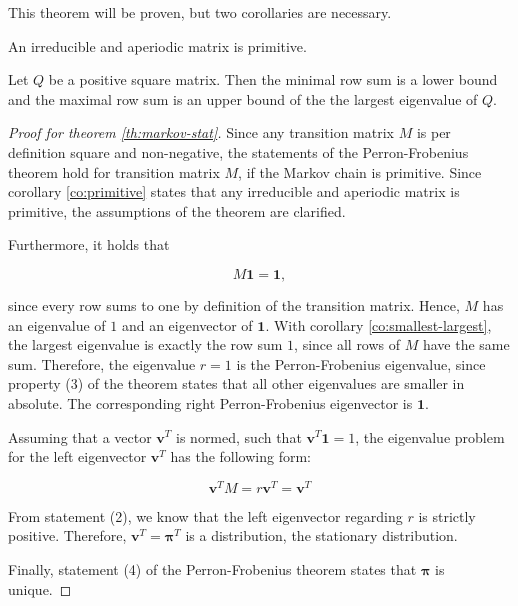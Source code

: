 This theorem will be proven, but two corollaries are necessary.

\begin{corollary}
\label{co:primitive}
An irreducible and aperiodic matrix is primitive.
\end{corollary}

\begin{corollary}
\label{co:smallest-largest}
Let $Q$ be a positive square matrix. Then the minimal row sum is a lower bound and the maximal row sum is an upper bound of the the largest eigenvalue of $Q$.
\end{corollary}

\begin{proof}[Proof for theorem \ref{th:markov-stat}]
Since any transition matrix $M$ is per definition square and non-negative, the statements of the Perron-Frobenius theorem hold for transition matrix $M$, if the Markov chain is primitive. Since corollary \ref{co:primitive} states that any irreducible and aperiodic matrix is primitive, the assumptions of the theorem are clarified.

Furthermore, it holds that

\begin{equation*}
M\mathbf{1} = \mathbf{1},
\end{equation*}

since every row sums to one by definition of the transition matrix. Hence, $M$ has an eigenvalue of $1$ and an eigenvector of $\mathbf{1}$. With corollary \ref{co:smallest-largest}, the largest eigenvalue is exactly the row sum $1$, since all rows of $M$ have the same sum. Therefore, the eigenvalue $r=1$ is the Perron-Frobenius eigenvalue, since property (3) of the theorem states that all other eigenvalues are smaller in absolute. The corresponding right Perron-Frobenius eigenvector is $\mathbf{1}$.

Assuming that a vector $\bm v^T$ is normed, such that $\bm v^T \mathbf{1} = 1$, the eigenvalue problem for the left eigenvector $\bm v^T$ has the following form:

\begin{equation*}
\bm v^T M = r \bm v^T = \bm v^T
\end{equation*}

From statement (2), we know that the left eigenvector regarding $r$ is strictly positive. Therefore, $\bm v^T = \bm\pi^T$ is a distribution, the stationary distribution.

Finally, statement (4) of the Perron-Frobenius theorem states that $\bm\pi$ is unique.
\end{proof}

